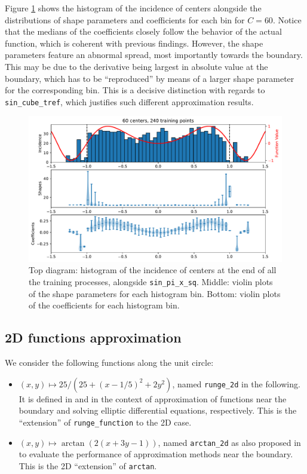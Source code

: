 \documentclass[12pt]{report} %
\begin{document}
Figure \ref{fig:triple-plot-sin-pi-x-sq-function} shows the histogram of the incidence of centers alongside the distributions of shape parameters and coefficients for each bin for $C=60$. Notice that the medians of the coefficients closely follow the behavior of the actual function, which is coherent with previous findings. However, the shape parameters feature an abnormal spread, most importantly towards the boundary. This may be due to the derivative being largest in absolute value at the boundary, which has to be ``reproduced'' by means of a larger shape parameter for the corresponding bin. This is a decisive distinction with regards to \texttt{sin\_cube\_tref}, which justifies such different approximation results.

\begin{figure}
  \includegraphics[width=\textwidth]{imagenes/experiments/1d/statistical_1d_full_scheduler_interpolation/sin_pi_x_sq/C60-TR240-sin_pi_x_sq.pdf}
  \caption{Top diagram: histogram of the incidence of centers at the end of all the training processes, alongside \texttt{sin\_pi\_x\_sq}. Middle: violin plots of the shape parameters for each histogram bin. Bottom: violin plots of the coefficients for each histogram bin.}
  \label{fig:triple-plot-sin-pi-x-sq-function}
\end{figure}



\clearpage

\subsection*{2D functions approximation}

We consider the following functions along the unit circle:

\begin{itemize}
  \item $(x,y)\mapsto 25/(25+(x-1/5)^2+2y^2)$, named \texttt{runge\_2d} in the following. It is defined in \cite{fornberg2002observations} and \cite{larsson2003numerical} in the context of approximation of functions near the boundary and solving elliptic differential equations, respectively. This is the ``extension'' of \texttt{runge\_function} to the 2D case.
  \item  $(x,y)\mapsto \arctan(2(x+3y-1))$, named \texttt{arctan\_2d} as also proposed in \cite{fornberg2002observations} to evaluate the performance of approximation methods near the boundary. This is the 2D ``extension'' of \texttt{arctan}.
\end{itemize}
\end{document}
